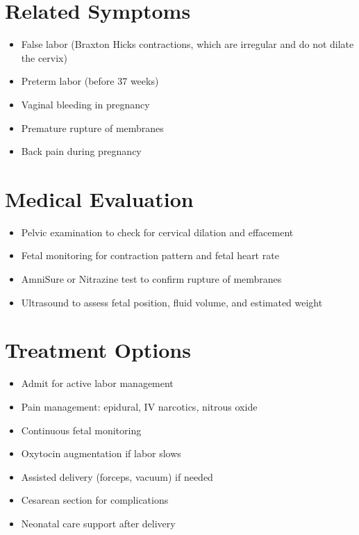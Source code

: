 \section*{Related Symptoms}
\begin{itemize}
\item False labor (Braxton Hicks contractions, which are irregular and do not dilate the cervix)
\item Preterm labor (before 37 weeks)
\item Vaginal bleeding in pregnancy
\item Premature rupture of membranes
\item Back pain during pregnancy
\end{itemize}

\section*{Medical Evaluation}
\begin{itemize}
\item Pelvic examination to check for cervical dilation and effacement
\item Fetal monitoring for contraction pattern and fetal heart rate
\item AmniSure or Nitrazine test to confirm rupture of membranes
\item Ultrasound to assess fetal position, fluid volume, and estimated weight
\end{itemize}

\section*{Treatment Options}
\begin{itemize}
\item Admit for active labor management
\item Pain management: epidural, IV narcotics, nitrous oxide
\item Continuous fetal monitoring
\item Oxytocin augmentation if labor slows
\item Assisted delivery (forceps, vacuum) if needed
\item Cesarean section for complications
\item Neonatal care support after delivery
\end{itemize}

